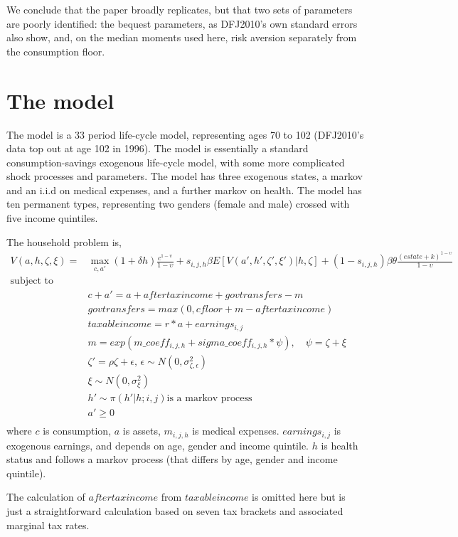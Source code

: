 \documentclass[11pt,fleqn]{article}
\begin{document}
We conclude that the paper broadly replicates, but that two sets of parameters are poorly identified: the bequest parameters, as DFJ2010's own standard errors also show, and, on the median moments used here, risk aversion separately from the consumption floor.

\section{The model}\label{sec:model}
The model is a 33 period life-cycle model, representing ages 70 to 102 (DFJ2010's data top out at age 102 in 1996). The model is essentially a standard consumption-savings exogenous life-cycle model, with some more complicated shock processes and parameters. The model has three exogenous states, a markov and an i.i.d on medical expenses, and a further markov on health. The model has ten permanent types, representing two genders (female and male) crossed with five income quintiles.

The household problem is,
\begin{align*}
 V(a,h,\zeta,\xi)  = & \max_{c,a'} (1+\delta h) \frac{c^{1-\upsilon}}{1-\upsilon} + s_{i,j,h} \beta E [V(a',h',\zeta',\xi')|h,\zeta] + (1- s_{i,j,h}) \beta \theta \frac{(estate+k)^{1-\upsilon}}{1-\upsilon} \\
 \text{subject to } & \\
 & c+a' = a + aftertaxincome + govtransfers - m \\
 & govtransfers=max(0,cfloor+m-aftertaxincome)  \\
 & taxableincome=r*a+earnings_{i,j} \\
 &  m=exp(m\_{}coeff_{i,j,h}+sigma\_{}coeff_{i,j,h}*\psi), \quad \psi=\zeta+\xi \\
 & \zeta' = \rho \zeta + \epsilon, \, \epsilon\sim N(0,\sigma_{\zeta,\epsilon}^2) \\
 & \xi \sim N(0,\sigma_{\xi}^2) \\
 & h' \sim \pi(h'|h; i,j) \text{is a markov process} \\
 & a' \geq 0 \\
\end{align*}
where $c$ is consumption, $a$ is assets, $m_{i,j,h}$ is medical expenses. $earnings_{i,j}$ is exogenous earnings, and depends on age, gender and income quintile. $h$ is health status and follows a markov process (that differs by age, gender and income quintile).

The calculation of $aftertaxincome$ from $taxableincome$ is omitted here but is just a straightforward calculation based on seven tax brackets and associated marginal tax rates.
\end{document}
